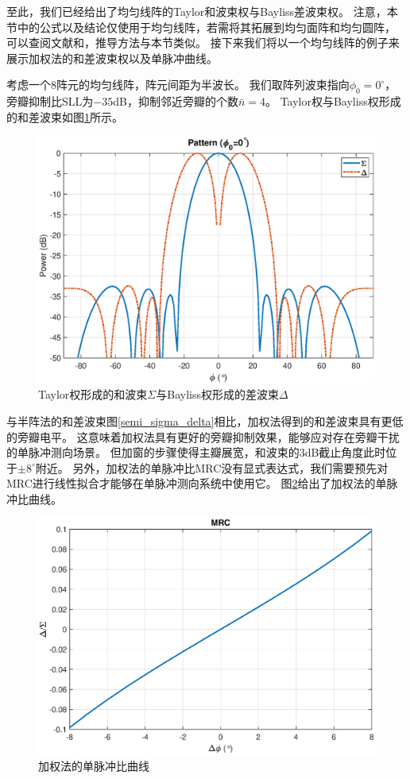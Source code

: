 \documentclass[master]{thesis-uestc}
\begin{document}
至此，我们已经给出了均匀线阵的Taylor和波束权与Bayliss差波束权。
注意，本节中的公式以及结论仅使用于均匀线阵，若需将其拓展到均匀面阵和均匀圆阵，
可以查阅文献\cite{Taylor}和\cite{Bayliss}，推导方法与本节类似。
接下来我们将以一个均匀线阵的例子来展示加权法的和差波束权以及单脉冲曲线。

考虑一个$8$阵元的均匀线阵，阵元间距为半波长。
我们取阵列波束指向$\phi_0=0^\circ$，旁瓣抑制比SLL为$-35$dB，抑制邻近旁瓣的个数$\bar{n}=4$。
Taylor权与Bayliss权形成的和差波束如图\ref{Taylor_Bayliss}所示。
\begin{figure}[h]
    \includegraphics[scale=0.4]{pic/Taylor_Bayliss.eps}
    \caption{Taylor权形成的和波束$\Sigma$与Bayliss权形成的差波束$\Delta$}
    \label{Taylor_Bayliss}
\end{figure}

与半阵法的和差波束图\ref{semi_sigma_delta}相比，加权法得到的和差波束具有更低的旁瓣电平。
这意味着加权法具有更好的旁瓣抑制效果，能够应对存在旁瓣干扰的单脉冲测向场景。
但加窗的步骤使得主瓣展宽，和波束的3dB截止角度此时位于$\pm8^\circ$附近。
另外，加权法的单脉冲比MRC没有显式表达式，我们需要预先对MRC进行线性拟合才能够在单脉冲测向系统中使用它。
图\ref{Taylor_Bayliss_MRC}给出了加权法的单脉冲比曲线。
\begin{figure}[h]
    \includegraphics[scale=0.4]{pic/Taylor_Bayliss_MRC.eps}
    \caption{加权法的单脉冲比曲线}
    \label{Taylor_Bayliss_MRC}
\end{figure}
\end{document}
